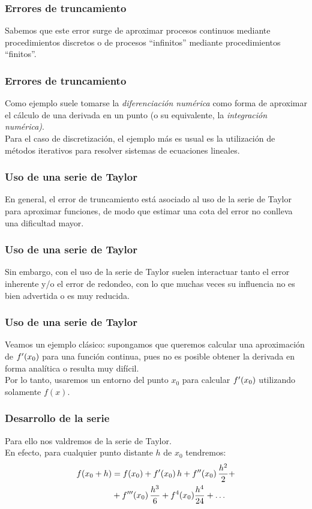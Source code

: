 \documentclass[12pt]{beamer}
\begin{document}
\begin{frame}
\frametitle{Errores de truncamiento}
Sabemos que este error surge de aproximar procesos continuos mediante procedimientos discretos o de procesos \enquote{infinitos} mediante procedimientos \enquote{finitos}.
\end{frame}
\begin{frame}
\frametitle{Errores de truncamiento}
Como ejemplo suele tomarse la \emph{\textcolor{ao}{diferenciación numérica}} como forma de aproximar el cálculo de una derivada en un punto (o su equivalente, la \emph{\textcolor{lilac}{integración numérica)}}.
\\
\bigskip
\pause
Para el caso de discretización, el ejemplo más es usual es la utilización de métodos iterativos para resolver sistemas de ecuaciones lineales.
\end{frame}
\begin{frame}
\frametitle{Uso de una serie de Taylor}
En general, el error de truncamiento está asociado al uso de la serie de Taylor para aproximar funciones, de modo que estimar una cota del error no conlleva una dificultad mayor.
\end{frame}
\begin{frame}
\frametitle{Uso de una serie de Taylor}
Sin embargo, con el uso de la serie de Taylor suelen interactuar tanto el error inherente y/o el error de redondeo, con lo que muchas veces su influencia no es bien advertida o es muy reducida. 
\end{frame}
\begin{frame}
\frametitle{Uso de una serie de Taylor}
Veamos un ejemplo clásico: supongamos que queremos calcular una aproximación de ${f}^{\prime} (x_{0})$ para una función continua, pues no es posible obtener la derivada en forma analítica o resulta muy difícil.
\\
\bigskip
\pause
Por lo tanto, usaremos un entorno del punto $x_{0}$ para calcular ${f}^{\prime} (x_{0})$ utilizando solamente $f (x)$.
\end{frame}
\begin{frame}
\frametitle{Desarrollo de la serie}
Para ello nos valdremos de la serie de Taylor.
\\
\bigskip
\pause
En efecto, para cualquier punto distante $h$ de $x_{0}$ tendremos:
\pause
\begin{align*}
f (x_{0} + h) &= f(x_{0}) + {f}^{\prime} (x_{0}) \, h + {f}^{\prime \prime} (x_{0}) \, \dfrac{h^{2}}{2} + \\
&+ {f}^{\prime \prime \prime} (x_{0}) \, \dfrac{h^{3}}{6} + f^{4}(x_{0}) \dfrac{h^{4}}{24} + \ldots
\end{align*}
\end{frame}
\end{document}
